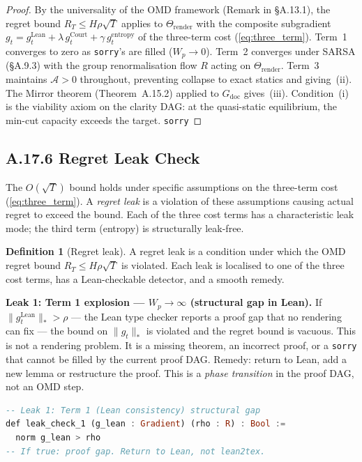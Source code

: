 \documentclass[11pt,a4paper]{article}
\theoremstyle{definition}
\newtheorem{definition}[theorem]{Definition}
\theoremstyle{remark}
\begin{document}
\begin{proof}
By the universality of the OMD framework (Remark in \S A.13.1), the regret bound $R_T \leq H\rho\sqrt{T}$ applies to $\Theta_{\mathrm{render}}$ with the composite subgradient $g_t = g_t^{\mathrm{Lean}} + \lambda\, g_t^{\mathrm{Court}} + \gamma\, g_t^{\mathrm{entropy}}$ of the three-term cost (\ref{eq:three_term}). Term~1 converges to zero as \texttt{sorry}'s are filled ($W_p \to 0$). Term~2 converges under SARSA (\S A.9.3) with the group renormalisation flow $R$ acting on $\Theta_{\mathrm{render}}$. Term~3 maintains $\mathcal{A} > 0$ throughout, preventing collapse to exact statics and giving~(ii). The Mirror theorem (Theorem~A.15.2) applied to $G_{\mathrm{doc}}$ gives~(iii). Condition~(i) is the viability axiom on the clarity DAG: at the quasi-static equilibrium, the min-cut capacity exceeds the target. \texttt{sorry}
\end{proof}


\subsection{A.17.6 Regret Leak Check}

The $O(\sqrt{T})$ bound holds under specific assumptions on the three-term cost (\ref{eq:three_term}). A \emph{regret leak} is a violation of these assumptions causing actual regret to exceed the bound. Each of the three cost terms has a characteristic leak mode; the third term (entropy) is structurally leak-free.

\begin{definition}[Regret leak]\label{def:leak}
A regret leak is a condition under which the OMD regret bound $R_T \leq H\rho\sqrt{T}$ is violated. Each leak is localised to one of the three cost terms, has a Lean-checkable detector, and a smooth remedy.
\end{definition}

\textbf{Leak 1: Term 1 explosion --- $W_p \to \infty$ (structural gap in Lean).} If $\|g_t^{\mathrm{Lean}}\|_* > \rho$ --- the Lean type checker reports a proof gap that no rendering can fix --- the bound on $\|g_t\|_*$ is violated and the regret bound is vacuous. This is not a rendering problem. It is a missing theorem, an incorrect proof, or a \texttt{sorry} that cannot be filled by the current proof DAG. Remedy: return to Lean, add a new lemma or restructure the proof. This is a \emph{phase transition} in the proof DAG, not an OMD step.

\begin{lstlisting}[language=Haskell]
-- Leak 1: Term 1 (Lean consistency) structural gap
def leak_check_1 (g_lean : Gradient) (rho : R) : Bool :=
  norm g_lean > rho
-- If true: proof gap. Return to Lean, not lean2tex.
\end{lstlisting}
\end{document}
